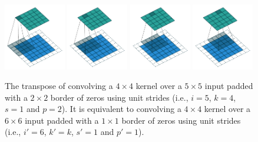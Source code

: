 \begin{figure}[p]
    \centering
    \includegraphics[width=0.24\textwidth]{pdf/arbitrary_padding_no_strides_transposed_00.pdf}
    \includegraphics[width=0.24\textwidth]{pdf/arbitrary_padding_no_strides_transposed_01.pdf}
    \includegraphics[width=0.24\textwidth]{pdf/arbitrary_padding_no_strides_transposed_02.pdf}
    \includegraphics[width=0.24\textwidth]{pdf/arbitrary_padding_no_strides_transposed_03.pdf}
    \caption{\label{fig:arbitrary_padding_no_strides_transposed} The transpose
        of convolving a $4 \times 4$ kernel over a $5 \times 5$ input padded
        with a $2 \times 2$ border of zeros using unit strides (i.e., $i = 5$,
        $k = 4$, $s = 1$ and $p = 2$). It is equivalent to convolving a $4
        \times 4$ kernel over a $6 \times 6$ input padded with a $1 \times 1$
        border of zeros using unit strides (i.e., $i' = 6$, $k' = k$, $s' = 1$
        and $p' = 1$).}
\end{figure}

